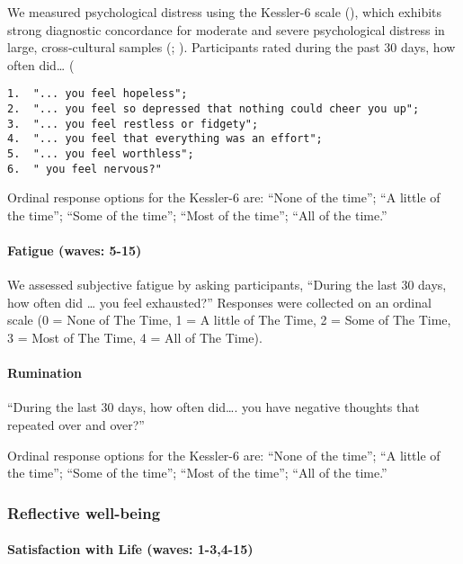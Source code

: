 \documentclass[
  singlecolumn,
  9pt]{article}
\let\oldparagraph\paragraph
\renewcommand{\paragraph}[1]{\oldparagraph{#1}\mbox{}}
\begin{document}
We measured psychological distress using the Kessler-6 scale
(), which exhibits
strong diagnostic concordance for moderate and severe psychological
distress in large, cross-cultural samples
(;
).
Participants rated during the past 30 days, how often did\ldots{} (

\begin{verbatim}
1.  "... you feel hopeless";
2.  "... you feel so depressed that nothing could cheer you up";
3.  "... you feel restless or fidgety";
4.  "... you feel that everything was an effort";
5.  "... you feel worthless";
6.  " you feel nervous?"
\end{verbatim}

Ordinal response options for the Kessler-6 are: ``None of the time'';
``A little of the time''; ``Some of the time''; ``Most of the time'';
``All of the time.''

\paragraph{Fatigue (waves: 5-15)}\label{fatigue-waves-5-15}

We assessed subjective fatigue by asking participants, ``During the last
30 days, how often did \ldots{} you feel exhausted?'' Responses were
collected on an ordinal scale (0 = None of The Time, 1 = A little of The
Time, 2 = Some of The Time, 3 = Most of The Time, 4 = All of The Time).

\paragraph{Rumination}\label{rumination}

``During the last 30 days, how often did\ldots. you have negative
thoughts that repeated over and over?''

Ordinal response options for the Kessler-6 are: ``None of the time'';
``A little of the time''; ``Some of the time''; ``Most of the time'';
``All of the time.''

\subsubsection{Reflective well-being}\label{reflective-well-being}

\paragraph{Satisfaction with Life (waves:
1-3,4-15)}\label{satisfaction-with-life-waves-1-34-15}
\end{document}
